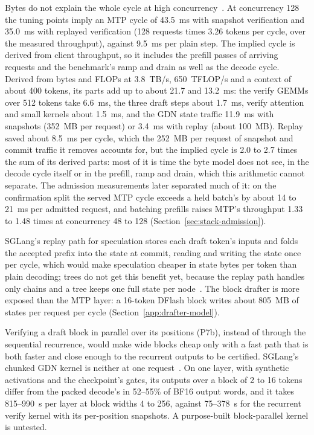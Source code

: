 Bytes do not explain the whole cycle at high concurrency~. At concurrency 128 the tuning points imply an MTP cycle of 43.5~ms with snapshot verification and 35.0~ms with replayed verification (128 requests times 3.26 tokens per cycle, over the measured throughput), against 9.5~ms per plain step. The implied cycle is derived from client throughput, so it includes the prefill passes of arriving requests and the benchmark's ramp and drain as well as the decode cycle. Derived from bytes and FLOPs at 3.8~TB/s, 650~TFLOP/s and a context of about 400 tokens, its parts add up to about 21.7 and 13.2~ms: the verify GEMMs over 512 tokens take 6.6~ms, the three draft steps about 1.7~ms, verify attention and small kernels about 1.5~ms, and the GDN state traffic 11.9~ms with snapshots (352~MB per request) or 3.4~ms with replay (about 100~MB). Replay saved about 8.5~ms per cycle, which the 252~MB per request of snapshot and commit traffic it removes accounts for, but the implied cycle is 2.0 to 2.7 times the sum of its derived parts: most of it is time the byte model does not see, in the decode cycle itself or in the prefill, ramp and drain, which this arithmetic cannot separate. The admission measurements later separated much of it: on the confirmation split the served MTP cycle exceeds a held batch's by about 14 to 21~ms per admitted request, and batching prefills raises MTP's throughput 1.33 to 1.48 times at concurrency 48 to 128 (Section~\ref{sec:stack-admission}).

SGLang's replay path for speculation stores each draft token's inputs and folds the accepted prefix into the state at commit, reading and writing the state once per cycle, which would make speculation cheaper in state bytes per token than plain decoding; trees do not get this benefit yet, because the replay path handles only chains and a tree keeps one full state per node~\cite{treewy,gdntreescan}. The block drafter is more exposed than the MTP layer: a 16-token DFlash block writes about 805~MB of states per request per cycle (Section~\ref{app:drafter-model}).

Verifying a draft block in parallel over its positions (P7b), instead of through the sequential recurrence, would make wide blocks cheap only with a fast path that is both faster and close enough to the recurrent outputs to be certified. SGLang's chunked GDN kernel is neither at one request~. On one layer, with synthetic activations and the checkpoint's gates, its outputs over a block of 2 to 16 tokens differ from the packed decode's in 52--55\% of BF16 output words, and it takes 815--990~\textmu s per layer at block widths 4 to 256, against 75--378~\textmu s for the recurrent verify kernel with its per-position snapshots. A purpose-built block-parallel kernel is untested.

